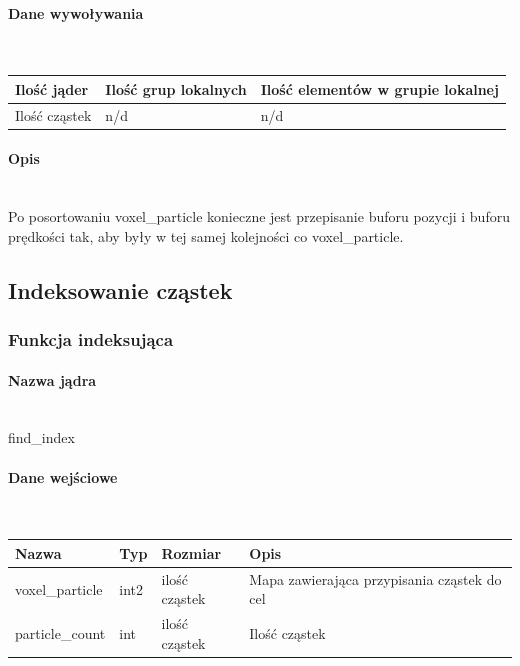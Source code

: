 \documentclass[polish, 12pt]{aghthesis}
\begin{document}
				\paragraph{Dane wywoływania} \ \\
					\begin{tabular}{| p{} | p{} | p{}|}
					\hline
						Ilość jąder & Ilość grup lokalnych & Ilość elementów w grupie lokalnej \\
					\hline
						Ilość cząstek & n/d & n/d \\ 
					\hline
					\end{tabular}
				\paragraph{Opis} \ \\
					\indent Po posortowaniu voxel\_particle konieczne jest przepisanie buforu pozycji i buforu prędkości tak, aby były w tej samej kolejności co voxel\_particle.
		\subsection{Indeksowanie cząstek}
			\subsubsection{Funkcja indeksująca}
				\paragraph{Nazwa jądra} \ \\
					find\_index
				\paragraph{Dane wejściowe} \ \\
					\begin{tabular}{| p{} | p{} | p{} | p{} |}
					\hline
						Nazwa & Typ & Rozmiar & Opis \\
					\hline
						voxel\_particle & int2 & ilość cząstek & Mapa zawierająca przypisania cząstek do cel \\ 
					\hline
						particle\_count & int & ilość cząstek & Ilość cząstek \\
					\hline
					\end{tabular}
\end{document}

